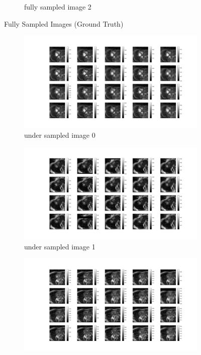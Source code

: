 \documentclass{article}
\begin{document}
\begin{figure}[ht]
\begin{subfigure}[b]{0.8\linewidth}
    \caption{fully sampled image 2}
  \end{subfigure}
  \caption{Fully Sampled Images (Ground Truth)}
  \label{fig:full_sampled_no_opt}
\end{figure}

\begin{figure}[ht]
  \centering
  \begin{subfigure}[b]{0.8\linewidth}
    \includegraphics[width=\linewidth]{../images/No_opt/under_sampling/under_sampling_0.png}
    \caption{under sampled image 0}
  \end{subfigure}
  \quad
  \begin{subfigure}[b]{0.8\linewidth}
    \includegraphics[width=\linewidth]{../images/No_opt/under_sampling/under_sampling_1.png}
    \caption{under sampled image 1}
  \end{subfigure}
  \quad
  \begin{subfigure}[b]{0.8\linewidth}
    \includegraphics[width=\linewidth]{../images/No_opt/under_sampling/under_sampling_2.png}

\end{subfigure}
\end{figure}
\end{document}
